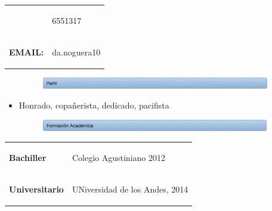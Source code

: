 \documentclass{article}
\begin{document}
\begin{table}[h]
\begin{center}
\begin{tabular}{ll}
\begin{footnotesize}
\begin{footnotesize} \smallskip \textbf{TELEFONO}       \end{footnotesize}          & \smallskip \begin{footnotesize}6551317\end{footnotesize}   \\ 
\begin{footnotesize} \smallskip \textbf{EMAIL:}      \end{footnotesize}             &  \smallskip \begin{footnotesize}da.noguera10\end{footnotesize} 
\end{tabular} 
\end{center} 
\end{table} 
\includegraphics[width=15cm, height=0.5cm]{prfl.png}
\begin{itemize} 
\item Honrado, copañerista, dedicado, pacifista
\end{itemize} 


\includegraphics[width=15cm, height=0.5cm]{frm.png}
\begin{table}[h] 
\begin{tabular}{ll} 
 \begin{footnotesize} \textbf{ \smallskip Bachiller}  \end{footnotesize}      & \smallskip \begin{footnotesize}Colegio Agustiniano 2012\end{footnotesize} \\ 
\begin{footnotesize} \textbf{ \smallskip Universitario}  \end{footnotesize}      & \smallskip \begin{footnotesize}UNiversidad de los Andes, 2014\end{footnotesize} \\ 
\end{tabular} 
\end{table} 
\end{document}

